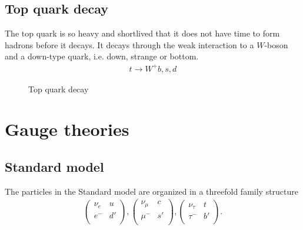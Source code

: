 \documentclass[11pt]{article}
\begin{document}
\begin{multicols}{2}
\subsection*{Top quark decay}

\begin{flushleft}
The top quark is so heavy and shortlived that it does not have time to form hadrons before it decays. It decays through the weak interaction to a $W$-boson and a down-type quark, i.e. down, strange or bottom.
\begin{align*}
t \rightarrow W^+ b,s,d
\end{align*}

\begin{figure}[H]
\centering
{}
\caption{Top quark decay}
\end{figure}
\end{flushleft}


\section{Gauge theories}

\subsection*{Standard model}
\begin{flushleft}
The particles in the Standard model are organized in a threefold family structure
\begin{align*}
\begin{pmatrix}
\nu_e & u\\
e^- & d'\\
\end{pmatrix}, 
\begin{pmatrix}
\nu_{\mu} & c\\
\mu^- & s'\\
\end{pmatrix},
\begin{pmatrix}
\nu_{\tau} & t\\
\tau^- & b'\\
\end{pmatrix}.
\end{align*}
\end{flushleft}


\end{multicols}
\end{document}
